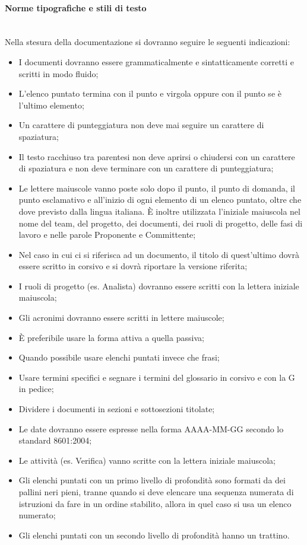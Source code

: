 \paragraph{Norme tipografiche e stili di testo} \hfill \\
\label{5.4}
Nella stesura della documentazione si dovranno seguire le seguenti indicazioni:
\begin{itemize}
\item I documenti dovranno essere grammaticalmente e sintatticamente corretti e scritti in modo fluido;
\item L'elenco puntato termina con il punto e virgola oppure con il punto se è l'ultimo elemento;
\item Un carattere di punteggiatura non deve mai seguire un carattere di spaziatura;
\item Il testo racchiuso tra parentesi non deve aprirsi o chiudersi con un carattere di spaziatura e non deve terminare con un carattere di punteggiatura;
\item Le lettere maiuscole vanno poste solo dopo il punto, il punto di domanda, il punto esclamativo e all'inizio di ogni elemento di un elenco puntato, oltre che dove previsto dalla lingua italiana. È inoltre utilizzata l'iniziale maiuscola nel nome del team, del progetto, dei documenti, dei ruoli di progetto, delle fasi di lavoro e nelle parole Proponente e Committente;
\item Nel caso in cui ci si riferisca ad un documento, il titolo di quest'ultimo dovrà essere scritto in corsivo e si dovrà riportare la versione riferita;
\item I ruoli di progetto (es. Analista) dovranno essere scritti con la lettera iniziale maiuscola;
\item Gli acronimi dovranno essere scritti in lettere maiuscole;
\item \`{E} preferibile usare la forma attiva a quella passiva;
\item Quando possibile usare elenchi puntati invece che frasi;
\item Usare termini specifici e segnare i termini del glossario in corsivo e con la G in pedice;
\item Dividere i documenti in sezioni e sottosezioni titolate;
\item Le date dovranno essere espresse nella forma AAAA-MM-GG secondo lo standard  8601:2004;
\item Le attivit\`{a} (es. Verifica) vanno scritte con la lettera iniziale maiuscola;
\item Gli elenchi puntati con un primo livello di profondità sono formati da dei pallini neri pieni, tranne quando si deve elencare una sequenza numerata di istruzioni da fare in un ordine stabilito, allora in quel caso si usa un elenco numerato;
\item Gli elenchi puntati con un secondo livello di profondità hanno un trattino.
\end{itemize}

